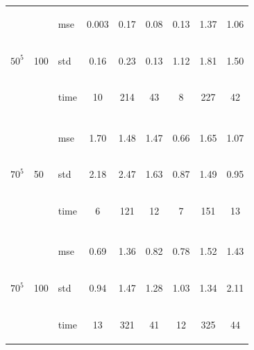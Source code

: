 \documentclass{article} %
\newcommand{\efoo}{\end{footnotesize}}
\newcommand{\bfoo}{\begin{footnotesize}}
\begin{document}
\begin{table}[t]
\begin{center}
\begin{small}
\begin{sc}
\begin{tabular}{lllcccccc}
\\
\multirow{3}{*}{$50^5$}&\multirow{3}{*}{100}&\bfoo mse\efoo&0.003&0.17&0.08&0.13&1.37&1.06\\
&&\bfoo std\efoo &0.16&0.23&0.13&1.12&1.81&1.50\\
&&\bfoo time\efoo &10&214&43&8&227&42\\

\\
\multirow{3}{*}{$70^5$}&\multirow{3}{*}{50}&\bfoo mse\efoo&1.70&1.48&1.47&0.66&1.65&1.07\\
&&\bfoo std\efoo &2.18&2.47&1.63&0.87&1.49&0.95\\
&&\bfoo time\efoo &6&121&12&7&151&13\\

\\
\multirow{3}{*}{$70^5$}&\multirow{3}{*}{100}&\bfoo mse\efoo&0.69&1.36&0.82&0.78&1.52&1.43\\
&&\bfoo std\efoo &0.94&1.47&1.28&1.03&1.34&2.11\\
&&\bfoo time\efoo &13&321&41&12&325&44\\

 \hline
\end{tabular}
\end{sc}
\end{small}
\end{center}
\vskip -0.1in
\end{table}
\end{document}
